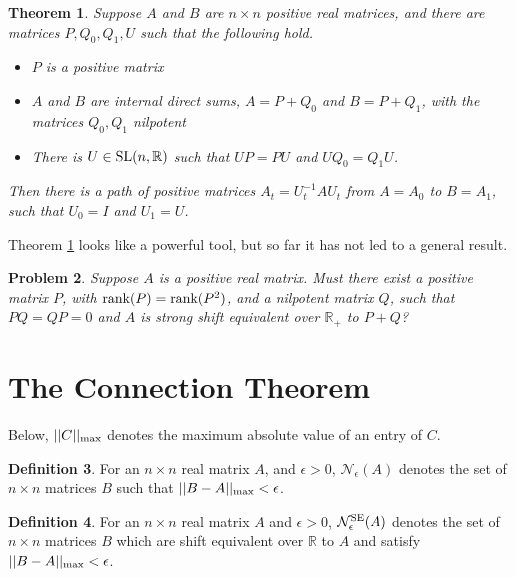 \documentclass{amsart}
\newtheorem{theorem}{Theorem}[section]
\newtheorem{problem}[theorem]{Problem}
\theoremstyle{definition}
\newtheorem{definition}[theorem]{Definition}
\theoremstyle{remark}
\numberwithin{equation}{section}
\begin{document}
{{\begin{theorem} \label{positivemodels}
Suppose $A$ and $B$ are $n\times n$ positive real matrices, 
and there are matrices $P,Q_0,Q_1,U$ such that the following hold. 
\begin{itemize} 
\item $P$ is a positive matrix  

\item $A$ and $B$ are internal direct sums,  
$A=P+Q_0$ and $B=P+Q_1$,  with the matrices 
$Q_0,Q_1$  nilpotent 

\item There is $U\in \textnormal{SL}(n,\mathbb R) $ such that 
$UP=PU$ and $UQ_0=Q_1U$. 
\end{itemize} 

Then there is a path of positive matrices $A_t=U_t^{-1}AU_t$ 
from $A=A_0$ to $B=A_1$, such that $U_0=I$ and $U_1=U$. 
\end{theorem} 

Theorem \ref{positivemodels} looks like a powerful tool, 
but so far it has not led to a general result. 

\begin{problem} \label{positive modelproblem}
Suppose $A$ is a positive real matrix.
Must there exist a positive matrix $P$, with 
$\textnormal{rank}(P)=\textnormal{rank}(P^2)$,  and a nilpotent matrix 
$Q$,  such that $PQ=QP=0$ and 
$A$ is strong shift equivalent over $\mathbb R_+$ 
to $P+Q$? 
\end{problem} 

\section{The Connection Theorem} \label{connectionsec}

Below, $||C||_{\textnormal{max}}$ denotes the maximum absolute value of an 
entry of $C$. 

\begin{definition}\label{defnnbhd} 
 For an $n\times n$ real matrix $A$,  and $\epsilon >0$,  
$\mathcal N_{\epsilon}(A)$ denotes the set of $n\times n$ 
matrices $B$ such that  $||B-A||_{\textnormal{max}}< \epsilon $. 
\end{definition} 

\begin{definition} For an $n\times n$ real matrix $A$ and $\epsilon >0$,  
$\mathcal N_{\epsilon}^{\textnormal{SE}}(A)$ denotes the set of $n\times n$ 
matrices $B$ which are shift equivalent over $\mathbb R$ to $A$ and 
satisfy $||B-A||_{\textnormal{max}}< \epsilon $. 
\end{definition} 

}}
\end{document}
